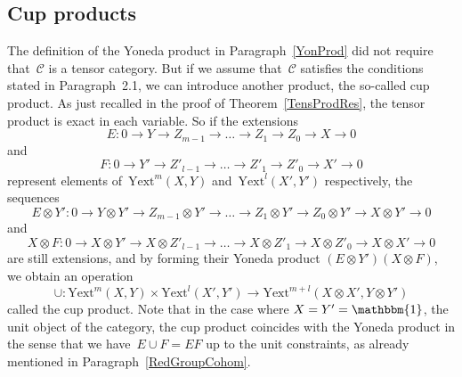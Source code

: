 \documentclass[12pt]{article}
\theoremstyle{definition}
\theoremstyle{break}
\newcommand{\CC}{\mathcal{C}}
\newcommand{\Yext}{\mathrm{Yext}}
\renewcommand{\1}{\mathbbm{1}}
\newcommand{\ot}{\mathbin{\otimes}}
\begin{document}
\subsection{Cup products} \label{CupProd}
The definition of the Yoneda product in Paragraph~\ref{YonProd} did not require that~$\CC$ is a tensor category. But if we assume that~$\CC$ satisfies the conditions stated in Paragraph~2.1, we can introduce another product, the so-called cup product. As just recalled in the proof of Theorem~\ref{TensProdRes}, the tensor product is exact in each variable. So if the extensions
\[E \colon 0 \to Y \to Z_{m-1} \to \dots \to Z_1 \to Z_0 \to X \to 0\]
and
\[F \colon 0 \to Y' \to Z'_{l-1} \to \dots \to Z'_1 \to Z'_0 \to X' \to 0\]
represent elements of~$\Yext^m(X,Y)$ and~$\Yext^l(X',Y')$ respectively, the sequences
\[E \ot Y' \colon 0 \to Y \ot Y' \to Z_{m-1} \ot Y' \to \dots \to Z_1 \ot Y' \to Z_0 \ot Y' \to X \ot Y' \to 0\]
and
\[X \ot F \colon 0 \to X \ot Y' \to X \ot Z'_{l-1} \to \dots \to X \ot Z'_1 \to X \ot Z'_0 \to X \ot X' \to 0\]
are still extensions, and by forming their Yoneda product
$(E \ot Y') (X \ot F)$, we obtain an operation
\[\cup \colon \Yext^m(X,Y) \times \Yext^l(X',Y') \to \Yext^{m+l}(X \ot X',Y \ot Y')\]
called the cup product. Note that in the case where $X=Y'=\1$, the unit object of the category, the cup product coincides with the Yoneda product in the sense that we have~$E \cup F = EF$ up to the unit constraints, as already mentioned in Paragraph~\ref{RedGroupCohom}.
\end{document}
